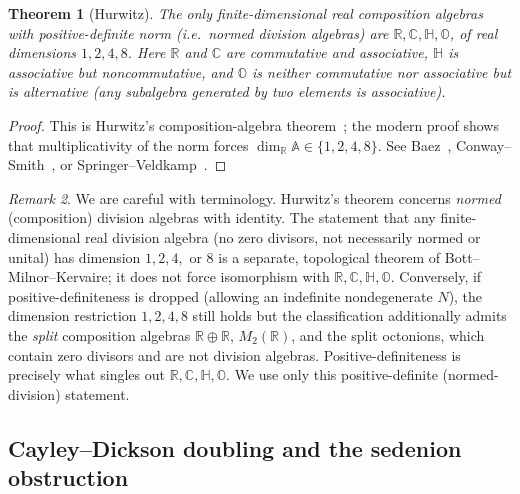 \documentclass[aps,prresearch,onecolumn,amsmath,amssymb,nofootinbib]{revtex4-2}
\theoremstyle{plain}\newtheorem{theorem}{Theorem}[section]\newtheorem{proposition}[theorem]{Proposition}\newtheorem{lemma}[theorem]{Lemma}\newtheorem{corollary}[theorem]{Corollary}
\theoremstyle{definition}\newtheorem{definition}[theorem]{Definition}\newtheorem{conjecture}[theorem]{Conjecture}
\theoremstyle{remark}\newtheorem{remark}[theorem]{Remark}
\begin{document}
\begin{theorem}[Hurwitz]
\label{thm:hurwitz}
The only finite-dimensional real composition algebras with \emph{positive-definite} norm (i.e.\ normed division algebras) are $\mathbb{R},\mathbb{C},\mathbb{H},\mathbb{O}$, of real dimensions $1,2,4,8$. Here $\mathbb{R}$ and $\mathbb{C}$ are commutative and associative, $\mathbb{H}$ is associative but noncommutative, and $\mathbb{O}$ is neither commutative nor associative but is alternative (any subalgebra generated by two elements is associative).
\end{theorem}

\begin{proof}
This is Hurwitz's composition-algebra theorem~\cite{Hurwitz1923}; the modern proof shows that multiplicativity of the norm forces $\dim_\mathbb{R}\mathbb{A}\in\{1,2,4,8\}$. See Baez~\cite[Sec.~2--3]{Baez2002}, Conway--Smith~\cite{ConwaySmith2003}, or Springer--Veldkamp~\cite{SpringerVeldkamp2000}.
\end{proof}

\begin{remark}
We are careful with terminology. Hurwitz's theorem concerns \emph{normed} (composition) division algebras with identity. The statement that any finite-dimensional real division algebra (no zero divisors, not necessarily normed or unital) has dimension $1,2,4,$ or $8$ is a separate, topological theorem of Bott--Milnor--Kervaire; it does not force isomorphism with $\mathbb{R},\mathbb{C},\mathbb{H},\mathbb{O}$. Conversely, if positive-definiteness is dropped (allowing an indefinite nondegenerate $N$), the dimension restriction $1,2,4,8$ still holds but the classification additionally admits the \emph{split} composition algebras $\mathbb{R}\oplus\mathbb{R}$, $M_2(\mathbb{R})$, and the split octonions, which contain zero divisors and are not division algebras. Positive-definiteness is precisely what singles out $\mathbb{R},\mathbb{C},\mathbb{H},\mathbb{O}$. We use only this positive-definite (normed-division) statement.
\end{remark}

\subsection{Cayley--Dickson doubling and the sedenion obstruction}
\end{document}
